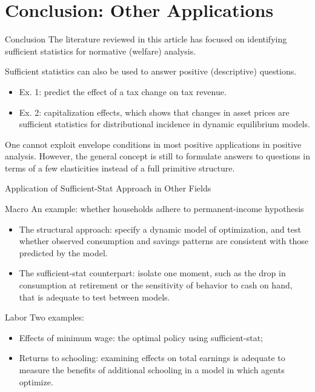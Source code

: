 \documentclass{beamer}
\begin{document}
\section{Conclusion: Other Applications}
\begin{frame}[shrink]
	\transfade %
	\tableofcontents[sectionstyle=show/shaded,subsectionstyle=show/shaded/hide]
	\addtocounter{framenumber}{-1}
\end{frame}
\begin{frame}{Conclusion}
	The literature reviewed in this article has focused on identifying sufficient statistics for normative (welfare) analysis.
	\medskip

	Sufficient statistics can also be used to answer positive (descriptive) questions.
	\begin{itemize}
		\item Ex. 1: predict the effect of a tax change on tax revenue.
		\item Ex. 2: capitalization effects, which shows that changes in asset prices are sufficient statistics for distributional incidence in dynamic equilibrium models.
	\end{itemize}

	One cannot exploit envelope conditions in most positive applications in positive analysis. However, the general concept is still to formulate answers to questions in terms of a few elasticities instead of a full primitive structure.
\end{frame}
\begin{frame}{Application of Sufficient-Stat Approach in Other Fields}
	\begin{block}{Macro}
		An example: whether households adhere to permanent-income hypothesis
		\begin{itemize}
			\item The structural approach: specify a dynamic model of optimization, and test whether observed consumption and savings patterns are consistent with those predicted by the model.
			\item The sufficient-stat counterpart: isolate one moment, such as the drop in consumption at retirement or the sensitivity of behavior to cash on hand, that is adequate to test between models.
		\end{itemize}
	\end{block}
	\begin{block}{Labor}
		Two examples:
		\begin{itemize}
			\item Effects of minimum wage: the optimal policy using sufficient-stat;
			\item Returns to schooling: examining effects on total earnings is adequate to measure the benefits of additional schooling in a model in which agents optimize.
		\end{itemize}
	\end{block}
\end{frame}
\end{document}
